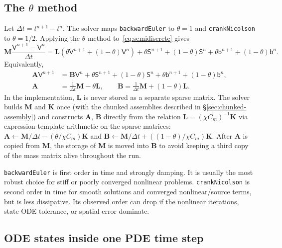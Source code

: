 \documentclass[11pt,a4paper]{article}
\newcommand{\code}[1]{\texttt{\small #1}}
\newcommand{\Mmass}{\mathbf{M}}
\newcommand{\Kstif}{\mathbf{K}}
\newcommand{\Lop}{\mathbf{L}}
\newcommand{\Aimp}{\mathbf{A}}
\newcommand{\Bimp}{\mathbf{B}}
\begin{document}
\subsection{The \texorpdfstring{$\theta$}{theta} method}

Let $\Delta t=t^{n+1}-t^n$. The solver maps \code{backwardEuler} to
$\theta=1$ and \code{crankNicolson} to $\theta=1/2$. Applying the
$\theta$ method to~\eqref{eq:semidiscrete} gives
\begin{equation}
  \Mmass\frac{\mathsf{V}^{n+1}-\mathsf{V}^{n}}{\Delta t}
  =
  \Lop\left(\theta\mathsf{V}^{n+1}+(1-\theta)\mathsf{V}^{n}\right)
  +
  \theta\mathsf{S}^{n+1}
  +(1-\theta)\mathsf{S}^{n}
  +\theta\mathsf{b}^{n+1}
  +(1-\theta)\mathsf{b}^{n}.
  \label{eq:theta}
\end{equation}
Equivalently,
\begin{align}
  \Aimp \mathsf{V}^{n+1}
  &=
  \Bimp \mathsf{V}^{n}
  +\theta\mathsf{S}^{n+1}
  +(1-\theta)\mathsf{S}^{n}
  +\theta\mathsf{b}^{n+1}
  +(1-\theta)\mathsf{b}^{n},
  \label{eq:implicit-system}\\
  \Aimp &= \frac{1}{\Delta t}\Mmass-\theta\Lop,\qquad
  \Bimp = \frac{1}{\Delta t}\Mmass+(1-\theta)\Lop.
\end{align}
In the implementation, $\Lop$ is never stored as a separate sparse matrix. The
solver builds $\Mmass$ and $\Kstif$ once (with the chunked assemblies described
in \S\ref{sec:chunked-assembly}) and constructs $\Aimp$, $\Bimp$ directly from
the relation $\Lop=(\chi C_m)^{-1}\Kstif$ via expression-template arithmetic on
the sparse matrices: $\Aimp\leftarrow\Mmass/\Delta t-(\theta/\chi C_m)\Kstif$
and $\Bimp\leftarrow\Mmass/\Delta t+((1-\theta)/\chi C_m)\Kstif$. After
$\Aimp$ is copied from $\Mmass$, the storage of $\Mmass$ is moved into $\Bimp$
to avoid keeping a third copy of the mass matrix alive throughout the run.

\code{backwardEuler} is first order in time and strongly damping. It is usually
the most robust choice for stiff or poorly converged nonlinear problems.
\code{crankNicolson} is second order in time for smooth solutions and converged
nonlinear/source terms, but is less dissipative. Its observed order can drop if
the nonlinear iterations, state ODE tolerance, or spatial error dominate.

\subsection{ODE states inside one PDE time step}
\end{document}
